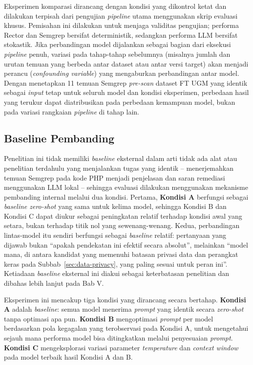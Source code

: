 Eksperimen komparasi dirancang dengan kondisi yang dikontrol ketat dan dilakukan terpisah dari pengujian \textit{pipeline} utama menggunakan skrip evaluasi khusus. Pemisahan ini dilakukan untuk menjaga validitas pengujian; performa Rector dan Semgrep bersifat deterministik, sedangkan performa LLM bersifat stokastik. Jika perbandingan model dijalankan sebagai bagian dari eksekusi \textit{pipeline} penuh, variasi pada tahap-tahap sebelumnya (misalnya jumlah dan urutan temuan yang berbeda antar dataset atau antar versi target) akan menjadi perancu (\textit{confounding variable}) yang mengaburkan perbandingan antar model. Dengan menetapkan 11 temuan Semgrep \textit{pre-scan} dataset FT UGM yang identik sebagai \textit{input} tetap untuk seluruh model dan kondisi eksperimen, perbedaan hasil yang terukur dapat diatribusikan pada perbedaan kemampuan model, bukan pada variasi rangkaian \textit{pipeline} di tahap lain.

\subsection{Baseline Pembanding}

Penelitian ini tidak memiliki \textit{baseline} eksternal dalam arti tidak ada alat atau penelitian terdahulu yang menjalankan tugas yang identik -- menerjemahkan temuan Semgrep pada kode PHP menjadi penjelasan dan saran remediasi menggunakan LLM lokal -- 
sehingga evaluasi dilakukan menggunakan mekanisme pembanding internal melalui dua kondisi. Pertama, \textbf{Kondisi A} berfungsi sebagai \textit{baseline zero-shot} yang sama untuk kelima model, sehingga Kondisi B dan Kondisi C dapat diukur sebagai peningkatan relatif terhadap kondisi awal yang setara, bukan terhadap titik nol yang sewenang-wenang. Kedua, perbandingan lintas-model itu sendiri berfungsi sebagai \textit{baseline} relatif: pertanyaan yang dijawab bukan ``apakah pendekatan ini efektif secara absolut'', melainkan ``model mana, di antara kandidat yang memenuhi batasan privasi data dan perangkat keras pada Subbab~\ref{sec:data-privacy}, yang paling sesuai untuk peran ini''. Ketiadaan \textit{baseline} eksternal ini diakui sebagai keterbatasan penelitian dan dibahas lebih lanjut pada Bab V.

Eksperimen ini mencakup tiga kondisi yang dirancang secara bertahap. \textbf{Kondisi A} adalah \textit{baseline}: semua model menerima \textit{prompt} yang identik secara \textit{zero-shot} tanpa optimasi apa pun. \textbf{Kondisi B} mengoptimasi \textit{prompt} per model berdasarkan pola kegagalan yang terobservasi pada Kondisi A, untuk mengetahui sejauh mana performa model bisa ditingkatkan melalui penyesuaian \textit{prompt}. \textbf{Kondisi C} mengeksplorasi variasi parameter \textit{temperature} dan \textit{context window} pada model terbaik hasil Kondisi A dan B.

